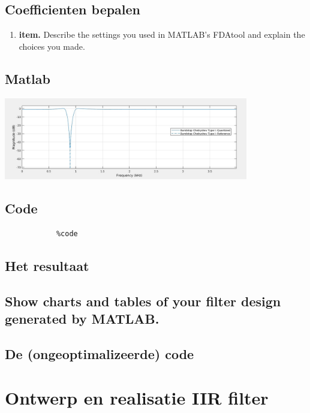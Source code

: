 \documentclass[11pt,a4paper]{article}
\newcommand\litem[1]{\item{\bfseries#1.\space}}
\begin{document}
		\subsection{Coefficienten bepalen}
	
		\begin{enumerate}[label=\emph{\alph*)}]
			\litem{item} Describe the settings you 					used in MATLAB’s FDAtool and explain the 					choices you made.
		\end{enumerate}
	
		\subsection{Matlab}
	
		\includegraphics[width=0.80\textwidth]{iirMatlab}\par\vspace{1cm}		
		
		\subsection{Code}

		\begin{lstlisting}
			%code
		\end{lstlisting}
		
		\subsection{Het resultaat}	

	\subsection{Show charts and tables of your filter design generated by MATLAB.}
	\clearpage
	
	\subsection{De (ongeoptimalizeerde) code}
	
	
	\section{Ontwerp en realisatie IIR filter}
\end{document}
